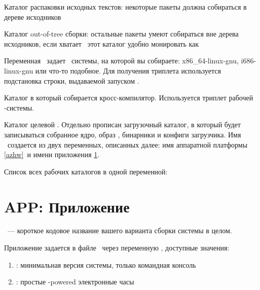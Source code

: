 
Каталог распаковки исходных текстов: некоторые пакеты должна собираться в дереве
исходников


Каталог out-of-tree сборки: остальные пакеты умеют собираться вне дерева
исходников, если хватает \ram\ этот каталог удобно монировать как 


Переменная \ задает \ системы, на которой вы
собираете: x86\_64-linux-gnu, i686-linux-gnu или что-то подобное. Для получения
триплета используется подстановка строки, выдаваемой запуском .


Каталог в который собирается кросс-компилятор. Используется триплет
рабочей \linux-системы.


Каталог целевой . Отдельно прописан загрузочный каталог, в который
будет записываться собранное ядро, образ , бинарники и конфиги
загрузчика. Имя \ создается из двух переменных, описанных далее: имя
аппаратной платформы \ref{azhw}\ и имени приложения
\ref{azapp}.


Список всех рабочих каталогов в одной переменной:


\section{APP: Приложение}\label{azapp}

\ --- короткое кодовое название вашего варианта сборки системы
в целом.

Приложение задается в файле \ через
переменную , доступные значения:

\begin{enumerate}
  \item {}: минимальная версия системы, только командная консоль
  \item {}: простые \linux-powered электронные часы
\end{enumerate}


